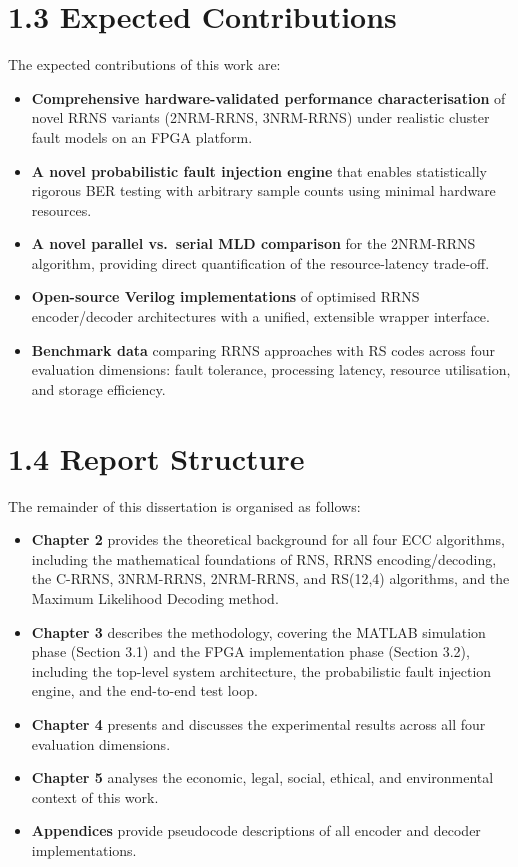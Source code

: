 \documentclass[
  english,
  12pt,
]{report}
\begin{document}
\section{1.3 Expected Contributions}\label{expected-contributions}

The expected contributions of this work are:

\begin{itemize}
\item
  \textbf{Comprehensive hardware-validated performance characterisation}
  of novel RRNS variants (2NRM-RRNS, 3NRM-RRNS) under realistic cluster
  fault models on an FPGA platform.
\item
  \textbf{A novel probabilistic fault injection engine} that enables
  statistically rigorous BER testing with arbitrary sample counts using
  minimal hardware resources.
\item
  \textbf{A novel parallel vs.~serial MLD comparison} for the 2NRM-RRNS
  algorithm, providing direct quantification of the resource-latency
  trade-off.
\item
  \textbf{Open-source Verilog implementations} of optimised RRNS
  encoder/decoder architectures with a unified, extensible wrapper
  interface.
\item
  \textbf{Benchmark data} comparing RRNS approaches with RS codes across
  four evaluation dimensions: fault tolerance, processing latency,
  resource utilisation, and storage efficiency.
\end{itemize}

\section{1.4 Report Structure}\label{report-structure}

The remainder of this dissertation is organised as follows:

\begin{itemize}
\item
  \textbf{Chapter 2} provides the theoretical background for all four
  ECC algorithms, including the mathematical foundations of RNS, RRNS
  encoding/decoding, the C-RRNS, 3NRM-RRNS, 2NRM-RRNS, and RS(12,4)
  algorithms, and the Maximum Likelihood Decoding method.
\item
  \textbf{Chapter 3} describes the methodology, covering the MATLAB
  simulation phase (Section 3.1) and the FPGA implementation phase
  (Section 3.2), including the top-level system architecture, the
  probabilistic fault injection engine, and the end-to-end test loop.
\item
  \textbf{Chapter 4} presents and discusses the experimental results
  across all four evaluation dimensions.
\item
  \textbf{Chapter 5} analyses the economic, legal, social, ethical, and
  environmental context of this work.
\item
  \textbf{Appendices} provide pseudocode descriptions of all encoder and
  decoder implementations.
\end{itemize}
\end{document}
